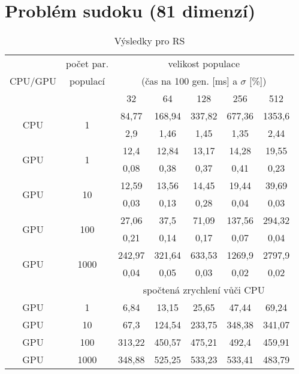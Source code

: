 \section{Problém sudoku (81 dimenzí)}\label{app SU}
\begin{table}[h]
    \begin{center}
    \begin{tabular}{ccccccc}
      \toprule
      \midrule
      \multirow{3}{*}{CPU/GPU} & počet par. & \multicolumn{5}{c}{velikost populace} \\
      & populací & \multicolumn{5}{c}{(čas na 100 gen. [ms] a $\sigma$ [\%])} \\
      & & 32 & 64 & 128 & 256 & 512 \\
      \midrule
      \multirow{2}{*}{CPU} & \multirow{2}{*}{1}
&84,77&168,94&337,82&677,36&1353,6\\
&&2,9&1,46&1,45&1,35&2,44\vspace{1.5mm}\\
\multirow{2}{*}{GPU} & \multirow{2}{*}{1}
&12,4&12,84&13,17&14,28&19,55\\
&&0,08&0,38&0,37&0,41&0,23\vspace{1.5mm}\\
\multirow{2}{*}{GPU} & \multirow{2}{*}{10}
&12,59&13,56&14,45&19,44&39,69\\
&&0,03&0,13&0,28&0,04&0,03\vspace{1.5mm}\\
\multirow{2}{*}{GPU} & \multirow{2}{*}{100}
&27,06&37,5&71,09&137,56&294,32\\
&&0,21&0,14&0,17&0,07&0,04\vspace{1.5mm}\\
\multirow{2}{*}{GPU} & \multirow{2}{*}{1000}
&242,97&321,64&633,53&1269,9&2797,9\\
&&0,04&0,05&0,03&0,02&0,02\\
\midrule
      & & \multicolumn{5}{c}{spočtená zrychlení vůči CPU} \\
\midrule
      GPU & 1
&6,84&13,15&25,65&47,44&69,24\\
GPU & 10
&67,3&124,54&233,75&348,38&341,07\\
GPU & 100
&313,22&450,57&475,21&492,4&459,91\\
GPU & 1000
&348,88&525,25&533,23&533,41&483,79\\
\midrule
      \bottomrule
    \end{tabular}
    \caption{Výsledky pro RS}
    \end{center}
\end{table}
\clearpage

